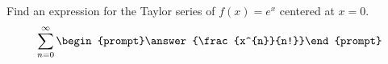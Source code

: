 \documentclass{ximera}
\author{Gregory Hartman \and Matthew Carr}
\begin{document}
\begin{exercise}






Find an expression for the Taylor series of $f(x)=e^{x}$ centered at $x=0$.
\[
\sum_{n=0}^{\infty}\begin{prompt}\answer{\frac{x^{n}}{n!}}\end{prompt}
\]

\end{exercise}
\end{document}
